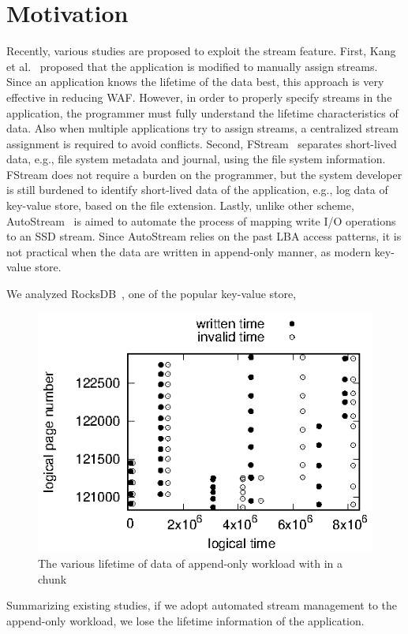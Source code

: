 \section{Motivation}
Recently, various studies are proposed to exploit the stream feature.
First, Kang et al.~\cite{MultiStream} proposed that the application
is modified to manually assign streams.
Since an application knows the lifetime of the data best, this approach
is very effective in reducing WAF.
However, in order to properly specify streams in the application, the programmer must
fully understand the lifetime characteristics of data.
Also when multiple applications try to assign streams, a centralized stream assignment
is required to avoid conflicts.
Second, FStream~\cite{FStream} separates short-lived data, e.g., file system metadata and
journal, using the file system information. 
FStream does not require a burden on the programmer, but the system developer is still burdened
to identify short-lived data of the application, e.g., log data of key-value store, based on the file extension.
Lastly, unlike other scheme, AutoStream~\cite{AutoStream} is aimed to automate the process of mapping 
write I/O operations to an SSD stream.
Since AutoStream relies on the past LBA access patterns, it is not practical when the data are written in
append-only manner, as modern key-value store.

We analyzed RocksDB~\cite{RocksDB}, one of the popular key-value store, 

\begin{figure}[!t]
	\centering
	\includegraphics[width=0.9\linewidth]{figure/chunklifetime} %
	\caption{The various lifetime of data of append-only workload with in a chunk}
	\label{fig:chunklifetime}
\end{figure}

Summarizing existing studies, if we adopt automated stream management to the append-only workload,
we lose the lifetime information of the application. 


